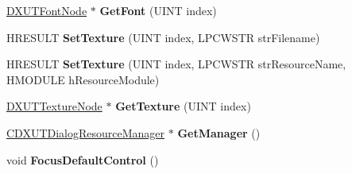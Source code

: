 \begin{DoxyCompactItemize}
\item 
\hypertarget{class_c_d_x_u_t_dialog_abbd6628848668c6f4af3d10fac4411f3}{\hyperlink{struct_d_x_u_t_font_node}{D\+X\+U\+T\+Font\+Node} $\ast$ {\bfseries Get\+Font} (U\+I\+N\+T index)}\label{class_c_d_x_u_t_dialog_abbd6628848668c6f4af3d10fac4411f3}

\item 
\hypertarget{class_c_d_x_u_t_dialog_aa391160093e64b7ea6b23b334079d960}{H\+R\+E\+S\+U\+L\+T {\bfseries Set\+Texture} (U\+I\+N\+T index, L\+P\+C\+W\+S\+T\+R str\+Filename)}\label{class_c_d_x_u_t_dialog_aa391160093e64b7ea6b23b334079d960}

\item 
\hypertarget{class_c_d_x_u_t_dialog_a136fb315f7d3405c9bd59cac96d32acc}{H\+R\+E\+S\+U\+L\+T {\bfseries Set\+Texture} (U\+I\+N\+T index, L\+P\+C\+W\+S\+T\+R str\+Resource\+Name, H\+M\+O\+D\+U\+L\+E h\+Resource\+Module)}\label{class_c_d_x_u_t_dialog_a136fb315f7d3405c9bd59cac96d32acc}

\item 
\hypertarget{class_c_d_x_u_t_dialog_a0d241bc13bf1be8bb179b8c822a5f1e1}{\hyperlink{struct_d_x_u_t_texture_node}{D\+X\+U\+T\+Texture\+Node} $\ast$ {\bfseries Get\+Texture} (U\+I\+N\+T index)}\label{class_c_d_x_u_t_dialog_a0d241bc13bf1be8bb179b8c822a5f1e1}

\item 
\hypertarget{class_c_d_x_u_t_dialog_afb938675ef8db32b8af0713db150b432}{\hyperlink{class_c_d_x_u_t_dialog_resource_manager}{C\+D\+X\+U\+T\+Dialog\+Resource\+Manager} $\ast$ {\bfseries Get\+Manager} ()}\label{class_c_d_x_u_t_dialog_afb938675ef8db32b8af0713db150b432}

\item 
\hypertarget{class_c_d_x_u_t_dialog_a3a1acadb4feabee897e520b2dbf24fe2}{void {\bfseries Focus\+Default\+Control} ()}\label{class_c_d_x_u_t_dialog_a3a1acadb4feabee897e520b2dbf24fe2}

\end{DoxyCompactItemize}
